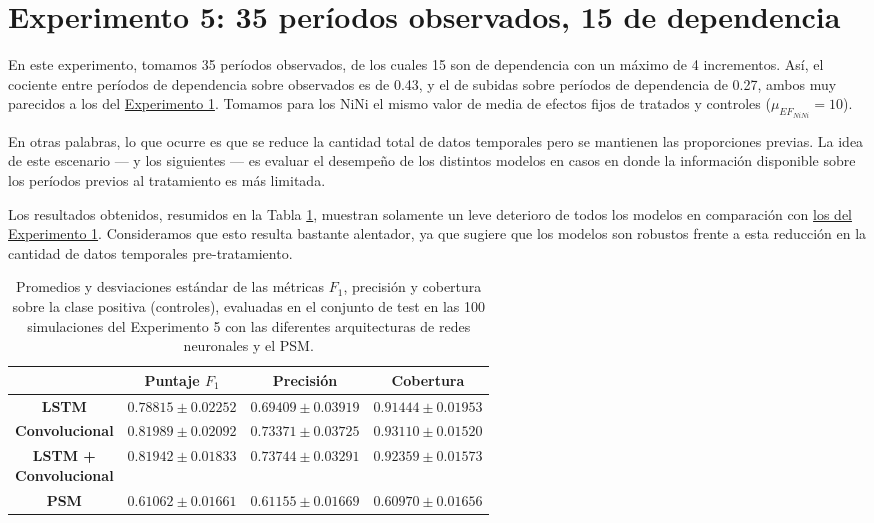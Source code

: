 \documentclass[../../main.tex]{subfiles}
\begin{document}
\section{Experimento 5: 35 períodos observados, 15 de dependencia} \label{sec:exp5}
En este experimento, tomamos 35 períodos observados, de los cuales 15 son de dependencia
con un máximo de 4 incrementos. Así, el cociente entre períodos de dependencia sobre
observados es de 0.43, y el de subidas sobre períodos de dependencia de 0.27, ambos muy
parecidos a los del \hyperref[sec:exp1]{Experimento 1}. Tomamos para los NiNi el mismo
valor de media de efectos fijos de tratados y controles (\(\mu_{{EF}_{NiNi}} = 10\)).

En otras palabras, lo que ocurre es que se reduce la cantidad total de datos temporales
pero se mantienen las proporciones previas. La idea de este escenario — y los siguientes —
es evaluar el desempeño de los distintos modelos en casos en donde la información
disponible sobre los períodos previos al tratamiento es más limitada.

Los resultados obtenidos, resumidos en la Tabla \ref{tab:results_exp5}, muestran solamente
un leve deterioro de todos los modelos en comparación con \hyperref[tab:results_exp1]{los
del Experimento 1}. Consideramos que esto resulta bastante alentador, ya que sugiere que
los modelos son robustos frente a esta reducción en la cantidad de datos temporales
pre-tratamiento.

\begin{table}[H]
    \centering
    \renewcommand{\arraystretch}{1.2}
    \begin{tabular}{|c|c|c|c|}
        \hline
         & \textbf{Puntaje} \(F_1\) & \textbf{Precisión} & \textbf{Cobertura} \\ \hline\hline
        \textbf{LSTM}
            & $0.78815 \pm 0.02252$ & $0.69409 \pm 0.03919$ & $0.91444 \pm 0.01953$ \\ \hline
        \textbf{Convolucional}
            & $\mathbf{0.81989 \pm 0.02092}$ & $0.73371 \pm 0.03725$ & $\mathbf{0.93110 \pm 0.01520}$ \\ \hline
        \makecell{\textbf{LSTM +} \\ \textbf{Convolucional}}
            & $0.81942 \pm 0.01833$ & $\mathbf{0.73744 \pm 0.03291}$ & $0.92359 \pm 0.01573$ \\ \hline
        \textbf{PSM}
            & $0.61062 \pm 0.01661$ & $0.61155 \pm 0.01669$ & $0.60970 \pm 0.01656$ \\
        \hline
    \end{tabular}
    \caption{Promedios y desviaciones estándar de las métricas \(F_1\), precisión y
    cobertura sobre la clase positiva (controles), evaluadas en el conjunto de test en las
    100 simulaciones del Experimento 5 con las diferentes arquitecturas de redes
    neuronales y el PSM.}
    \label{tab:results_exp5}
\end{table}
\end{document}
